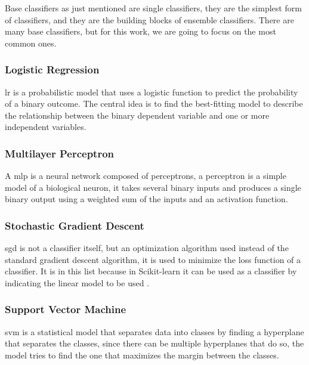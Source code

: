 Base classifiers as just mentioned are single classifiers, they are the simplest form of classifiers, and they are the building blocks of ensemble classifiers. There are many base classifiers, but for this work, we are going to focus on the most common ones.


\subsubsection{Logistic Regression}
\ac{lr} is a probabilistic model that uses a logistic function to predict the probability of a binary outcome. The central idea is to find the best-fitting model to describe the relationship between the binary dependent variable and one or more independent variables.

\subsubsection{Multilayer Perceptron}
A \ac{mlp} is a neural network composed of perceptrons, a perceptron is a simple model of a biological neuron, it takes several binary inputs and produces a single binary output using a weighted sum of the inputs and an activation function.

\subsubsection{Stochastic Gradient Descent}
\ac{sgd} is not a classifier itself, but an optimization algorithm used instead of the standard gradient descent algorithm, it is used to minimize the loss function of a classifier. It is in this list because in Scikit-learn it can be used as a classifier by indicating the linear model to be used \cite{noauthor_sklearnlinear_modelsgdclassifier_nodate}.

\subsubsection{Support Vector Machine}
\ac{svm} is a statistical model that separates data into classes by finding a hyperplane that separates the classes, since there can be multiple hyperplanes that do so, the model tries to find the one that maximizes the margin between the classes.

